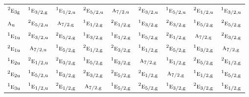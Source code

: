 \documentclass[10pt,a4paper]{article}
\numberwithin{equation}{section}
\newcommand{\irr}[1]{\text{\normalfont\scshape #1}}
\newcommand{\conjpair}[1]{{}^{#1}}
\newcommand{\ptag}[1]{\mathrm{#1}}
\begin{document}
{\begin{longtable}{@{}lcccccccc@{}}
$\conjpair{2}\irr{e}_{3\ptag{g}}$ & $\conjpair{1}\irr{e}_{3/2,\ptag{g}}$ & $\conjpair{1}\irr{e}_{1/2,\ptag{u}}$ & $\conjpair{2}\irr{e}_{5/2,\ptag{u}}$ & $\irr{a}_{7/2,\ptag{u}}$ & $\conjpair{2}\irr{e}_{3/2,\ptag{u}}$ & $\conjpair{1}\irr{e}_{5/2,\ptag{u}}$ & $\conjpair{2}\irr{e}_{1/2,\ptag{u}}$ & $\conjpair{1}\irr{e}_{3/2,\ptag{u}}$\\
$\irr{a}_{\ptag{u}}$ & $\conjpair{2}\irr{e}_{5/2,\ptag{u}}$ & $\irr{a}_{7/2,\ptag{g}}$ & $\conjpair{1}\irr{e}_{1/2,\ptag{g}}$ & $\conjpair{2}\irr{e}_{1/2,\ptag{g}}$ & $\conjpair{1}\irr{e}_{3/2,\ptag{g}}$ & $\conjpair{2}\irr{e}_{3/2,\ptag{g}}$ & $\conjpair{1}\irr{e}_{5/2,\ptag{g}}$ & $\conjpair{2}\irr{e}_{5/2,\ptag{g}}$\\
$\conjpair{1}\irr{e}_{1\ptag{u}}$ & $\conjpair{2}\irr{e}_{3/2,\ptag{u}}$ & $\conjpair{2}\irr{e}_{5/2,\ptag{g}}$ & $\conjpair{1}\irr{e}_{3/2,\ptag{g}}$ & $\conjpair{1}\irr{e}_{1/2,\ptag{g}}$ & $\conjpair{1}\irr{e}_{5/2,\ptag{g}}$ & $\conjpair{2}\irr{e}_{1/2,\ptag{g}}$ & $\irr{a}_{7/2,\ptag{g}}$ & $\conjpair{2}\irr{e}_{3/2,\ptag{g}}$\\
$\conjpair{2}\irr{e}_{1\ptag{u}}$ & $\irr{a}_{7/2,\ptag{u}}$ & $\conjpair{1}\irr{e}_{5/2,\ptag{g}}$ & $\conjpair{2}\irr{e}_{1/2,\ptag{g}}$ & $\conjpair{2}\irr{e}_{3/2,\ptag{g}}$ & $\conjpair{1}\irr{e}_{1/2,\ptag{g}}$ & $\conjpair{2}\irr{e}_{5/2,\ptag{g}}$ & $\conjpair{1}\irr{e}_{3/2,\ptag{g}}$ & $\irr{a}_{7/2,\ptag{g}}$\\
$\conjpair{1}\irr{e}_{2\ptag{u}}$ & $\conjpair{2}\irr{e}_{1/2,\ptag{u}}$ & $\conjpair{2}\irr{e}_{3/2,\ptag{g}}$ & $\conjpair{1}\irr{e}_{5/2,\ptag{g}}$ & $\conjpair{1}\irr{e}_{3/2,\ptag{g}}$ & $\irr{a}_{7/2,\ptag{g}}$ & $\conjpair{1}\irr{e}_{1/2,\ptag{g}}$ & $\conjpair{2}\irr{e}_{5/2,\ptag{g}}$ & $\conjpair{2}\irr{e}_{1/2,\ptag{g}}$\\
$\conjpair{2}\irr{e}_{2\ptag{u}}$ & $\conjpair{1}\irr{e}_{5/2,\ptag{u}}$ & $\conjpair{1}\irr{e}_{3/2,\ptag{g}}$ & $\conjpair{2}\irr{e}_{3/2,\ptag{g}}$ & $\conjpair{2}\irr{e}_{5/2,\ptag{g}}$ & $\conjpair{2}\irr{e}_{1/2,\ptag{g}}$ & $\irr{a}_{7/2,\ptag{g}}$ & $\conjpair{1}\irr{e}_{1/2,\ptag{g}}$ & $\conjpair{1}\irr{e}_{5/2,\ptag{g}}$\\
$\conjpair{1}\irr{e}_{3\ptag{u}}$ & $\conjpair{1}\irr{e}_{1/2,\ptag{u}}$ & $\conjpair{2}\irr{e}_{1/2,\ptag{g}}$ & $\irr{a}_{7/2,\ptag{g}}$ & $\conjpair{1}\irr{e}_{5/2,\ptag{g}}$ & $\conjpair{2}\irr{e}_{5/2,\ptag{g}}$ & $\conjpair{1}\irr{e}_{3/2,\ptag{g}}$ & $\conjpair{2}\irr{e}_{3/2,\ptag{g}}$ & $\conjpair{1}\irr{e}_{1/2,\ptag{g}}$\\

\end{longtable}}
\end{document}
